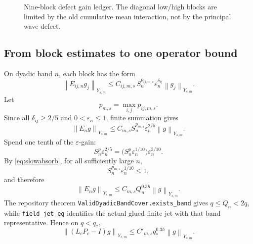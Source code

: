 \documentclass[11pt]{article}
\numberwithin{equation}{section}
\newcommand{\eps}{\varepsilon}
\newcommand{\norm}[1]{\left\lVert #1\right\rVert}
\begin{document}
\begin{figure}[ht]
\centering
{}
\caption{Nine-block defect gain ledger.  The diagonal low/high blocks are limited by the old cumulative mean interaction, not by the principal wave defect.}
\label{fig:gainmatrix}
\end{figure}

\subsection{From block estimates to one operator bound}
On dyadic band \(n\), each block has the form
\begin{equation}
\norm{E_{ij,n}g_j}_{Y_{s,m}}
\le C_{ij,m,s}\,S_n^{p_{ij,m,s}}\eps_n^{\delta_{ij}}\norm{g_j}_{Y_{s,m}}.
\label{eq:blockest}
\end{equation}
Let
\begin{equation}
p_{m,s}=\max_{i,j}p_{ij,m,s}.
\label{eq:pmax}
\end{equation}
Since all \(\delta_{ij}\ge2/5\) and \(0<\eps_n\le1\), finite summation gives
\begin{equation}
\norm{E_ng}_{Y_{s,m}}
\le C_{m,s}S_n^{p_{m,s}}\eps_n^{2/5}\norm g_{Y_{s,m}}.
\label{eq:localdefect}
\end{equation}
Spend one tenth of the \(\eps\)-gain:
\begin{equation}
S_n^p\eps_n^{2/5}
=\bigl(S_n^p\eps_n^{1/10}\bigr)\eps_n^{3/10}.
\label{eq:spend}
\end{equation}
By \eqref{eq:slowabsorb}, for all sufficiently large \(n\),
\begin{equation}
S_n^{p_{m,s}}\eps_n^{1/10}\le1,
\label{eq:absorb}
\end{equation}
and therefore
\begin{equation}
\norm{E_ng}_{Y_{s,m}}
\le C_{m,s}Q_n^{0.3h}\norm g_{Y_{s,m}}.
\label{eq:banddefect}
\end{equation}
The repository theorem \texttt{ValidDyadicBandCover.exists\_band} gives \(q\le Q_n<2q\), while \texttt{field\_jet\_eq} identifies the actual glued finite jet with that band representative.  Hence on \(q<q_*\),
\begin{equation}
\boxed{
\norm{(L_cP_c-I)g}_{Y_{s,m}}
\le C'_{m,s}q_*^{0.3h}\norm g_{Y_{s,m}}.}
\label{eq:globaldefect}
\end{equation}
\end{document}
